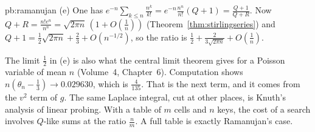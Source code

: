 \begin{solution}{pb:ramanujan}
(e) One has $e^{-n}\sum_{k\le n}\frac{n^k}{k!}=e^{-n}\frac{n^n}{n!}(Q+1)=\frac{Q+1}{Q+R}$. Now $Q+R=\frac{n!e^n}{n^n}=\sqrt{2\pi n}\,(1+O(\frac1n))$ (Theorem~\ref{thm:stirlingseries}) and $Q+1=\frac12\sqrt{2\pi n}+\frac23+O(n^{-1/2})$, so the ratio is
$\frac12+\frac2{3\sqrt{2\pi n}}+O(\frac1n)$.

\leads The limit $\frac12$ in (e) is also what the central limit theorem gives for a Poisson variable of mean $n$ (Volume~4, Chapter~6). Computation shows $n(\theta_n-\frac13)\to0.029630$, which is $\frac4{135}$. That is the next term, and it comes from the $v^2$ term of $g$. The same Laplace
integral, cut at other places, is Knuth's analysis of linear probing. With a table of $m$ cells and $n$ keys, the cost of a search involves $Q$-like
sums at the ratio $\frac nm$. A full table is exactly Ramanujan's case.
\end{solution}

